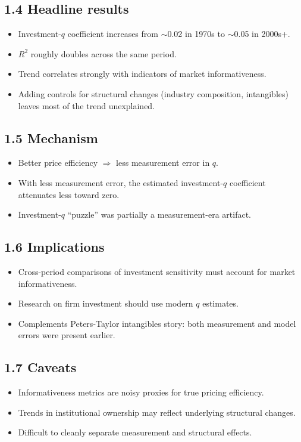 \documentclass[11pt]{article}
\begin{document}
\subsection*{1.4 Headline results}
\begin{itemize}
\item Investment-$q$ coefficient increases from $\sim$0.02 in 1970s to $\sim$0.05 in 2000s+.
\item $R^2$ roughly doubles across the same period.
\item Trend correlates strongly with indicators of market informativeness.
\item Adding controls for structural changes (industry composition, intangibles) leaves most of the trend unexplained.
\end{itemize}

\subsection*{1.5 Mechanism}
\begin{itemize}
\item Better price efficiency $\Rightarrow$ less measurement error in $q$.
\item With less measurement error, the estimated investment-$q$ coefficient attenuates less toward zero.
\item Investment-$q$ ``puzzle'' was partially a measurement-era artifact.
\end{itemize}

\subsection*{1.6 Implications}
\begin{itemize}
\item Cross-period comparisons of investment sensitivity must account for market informativeness.
\item Research on firm investment should use modern $q$ estimates.
\item Complements Peters-Taylor intangibles story: both measurement and model errors were present earlier.
\end{itemize}

\subsection*{1.7 Caveats}
\begin{alertbox}
\begin{itemize}
\item Informativeness metrics are noisy proxies for true pricing efficiency.
\item Trends in institutional ownership may reflect underlying structural changes.
\item Difficult to cleanly separate measurement and structural effects.
\end{itemize}
\end{alertbox}
\end{document}
